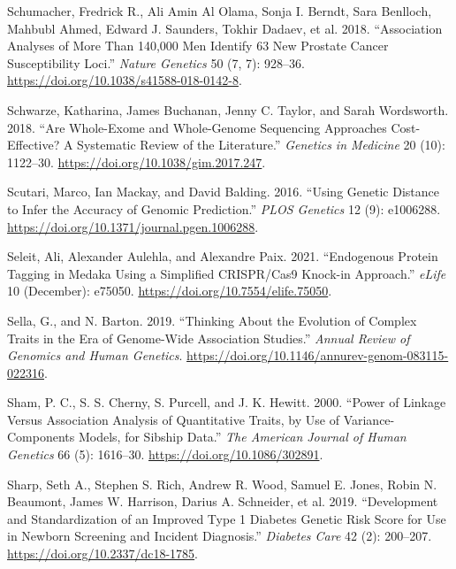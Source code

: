 \documentclass[
]{book}
\newlength{\cslhangindent}
\newlength{\cslentryspacingunit} %
\newenvironment{CSLReferences}[2] %
 {%
  \setlength{\parindent}{0pt}
  \ifodd #1
  \let\oldpar\par
  \def\par{\hangindent=\cslhangindent\oldpar}
  \fi
  \setlength{\parskip}{#2\cslentryspacingunit}
 }%
 {}
\begin{document}
\begin{CSLReferences}{1}{0}
\leavevmode{}%
Schumacher, Fredrick R., Ali Amin Al Olama, Sonja I. Berndt, Sara Benlloch, Mahbubl Ahmed, Edward J. Saunders, Tokhir Dadaev, et al. 2018. {``Association Analyses of More Than 140,000 Men Identify 63 New Prostate Cancer Susceptibility Loci.''} \emph{Nature Genetics} 50 (7, 7): 928--36. \url{https://doi.org/10.1038/s41588-018-0142-8}.

\leavevmode{}%
Schwarze, Katharina, James Buchanan, Jenny C. Taylor, and Sarah Wordsworth. 2018. {``Are Whole-Exome and Whole-Genome Sequencing Approaches Cost-Effective? {A} Systematic Review of the Literature.''} \emph{Genetics in Medicine} 20 (10): 1122--30. \url{https://doi.org/10.1038/gim.2017.247}.

\leavevmode{}%
Scutari, Marco, Ian Mackay, and David Balding. 2016. {``Using {Genetic Distance} to {Infer} the {Accuracy} of {Genomic Prediction}.''} \emph{PLOS Genetics} 12 (9): e1006288. \url{https://doi.org/10.1371/journal.pgen.1006288}.

\leavevmode{}%
Seleit, Ali, Alexander Aulehla, and Alexandre Paix. 2021. {``Endogenous Protein Tagging in Medaka Using a Simplified {CRISPR}/{Cas9} Knock-in Approach.''} \emph{eLife} 10 (December): e75050. \url{https://doi.org/10.7554/elife.75050}.

\leavevmode{}%
Sella, G., and N. Barton. 2019. {``Thinking {About} the {Evolution} of {Complex Traits} in the {Era} of {Genome-Wide Association Studies}.''} \emph{Annual Review of Genomics and Human Genetics}. \url{https://doi.org/10.1146/annurev-genom-083115-022316}.

\leavevmode{}%
Sham, P. C., S. S. Cherny, S. Purcell, and J. K. Hewitt. 2000. {``Power of {Linkage} Versus {Association Analysis} of {Quantitative Traits}, by {Use} of {Variance-Components Models}, for {Sibship Data}.''} \emph{The American Journal of Human Genetics} 66 (5): 1616--30. \url{https://doi.org/10.1086/302891}.

\leavevmode{}%
Sharp, Seth A., Stephen S. Rich, Andrew R. Wood, Samuel E. Jones, Robin N. Beaumont, James W. Harrison, Darius A. Schneider, et al. 2019. {``Development and {Standardization} of an {Improved Type} 1 {Diabetes Genetic Risk Score} for {Use} in {Newborn Screening} and {Incident Diagnosis}.''} \emph{Diabetes Care} 42 (2): 200--207. \url{https://doi.org/10.2337/dc18-1785}.


\end{CSLReferences}
\end{document}

